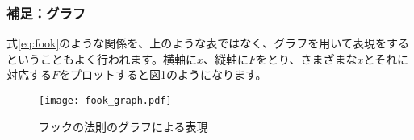 \documentclass[uplatex,dvipdfmx]{jsarticle}
\begin{document}
	\vspace{0.5cm}

	\subsubsection*{補足：グラフ}
	式\ref{eq:fook}のような関係を、上のような表ではなく、グラフを用いて表現をするということもよく行われます。横軸に$x$、縦軸に$F$をとり、さまざまな$x$とそれに対応する$F$をプロットすると図\ref{fig:fook}のようになります。
	
	\begin{figure}[htbp]
		\centering
		\texttt{[image: fook\_graph.pdf]}
		\caption{フックの法則のグラフによる表現}
		\label{fig:fook}
	\end{figure}



	
	
	
	
	
\end{document}
